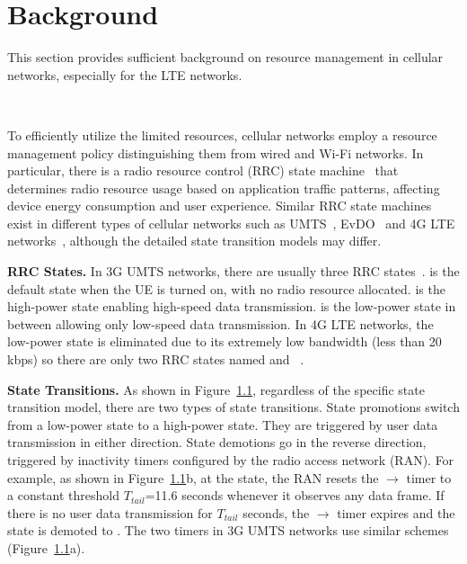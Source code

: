 \chapter{Background} \label{chap:bkg}

This section provides sufficient background on resource management in cellular networks, especially for the LTE networks.

\label{sec:bkg.rrc}

\begin{figure}[t]
\centering
{}\\
\label{fig:rrc}
\end{figure}

To efficiently utilize the limited resources, cellular networks employ a resource management policy distinguishing them from wired and Wi-Fi networks. In particular, there is a radio resource control (RRC) state machine~\cite{imc.3g} that determines radio resource usage based on application traffic patterns, affecting device energy consumption and user experience. Similar RRC state machines exist in different types of cellular networks such as UMTS~\cite{imc.3g}, EvDO~\cite{ChatterjeeD02} and 4G LTE networks~\cite{huang_mobisys12}, although the detailed state transition models may differ.

\textbf{RRC States.} In 3G UMTS networks, there are usually three RRC states~\cite{imc.3g, mobisys.aro}. \RI is the default state when the UE is turned on, with no radio resource allocated. \RD is the high-power state enabling high-speed data transmission. \RF is the low-power state in between allowing only low-speed data transmission. In 4G LTE networks, the low-power state is eliminated due to its extremely low bandwidth (less than 20 kbps) so there are only two RRC states named \RC and \RI~\cite{tr25.813, ts36.331}.

\textbf{State Transitions.}
As shown in Figure~\ref{fig:rrc}, regardless of the specific state transition model, there are two types of state transitions. State promotions switch from a low-power state to a high-power state. They are triggered by user data transmission in either direction. State demotions go in the reverse direction, triggered by inactivity timers configured by the radio access network (RAN). For example, as shown in Figure~\ref{fig:rrc}b, at the \RC state, the RAN resets the \RC$\rightarrow$ \RI timer to a constant threshold $T_{tail}$=11.6 seconds whenever it observes any data frame. If there is no user data transmission for $T_{tail}$ seconds, the \RC$\rightarrow$ \RI timer expires and the state is demoted to \RI. The two timers in 3G UMTS networks use similar schemes (Figure~\ref{fig:rrc}a).

